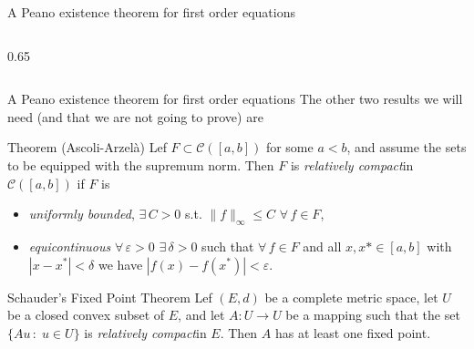\documentclass[aspectratio=169,xcolor=dvipsnames]{beamer}
\begin{document}
\begin{frame}{A Peano existence theorem for first order equations}
{{\begin{columns}
\begin{column}{0.65\columnwidth}
\end{column}
\end{columns}
}
}
\end{frame}

\begin{frame}[fragile]{A Peano existence theorem for first order equations}
The other two results we will need (and that we are not going to prove) are
\begin{alertblock}{Theorem (Ascoli-Arzelà)}
Lef $F \subset \mathcal{C}([a,b])$ for some $a < b$, and assume the sets to be equipped with the supremum norm. Then $F$ is \emph{relatively compact}\footnotemark[1] in $\mathcal{C}([a,b])$ if $F$ is \begin{itemize}
	\item \emph{uniformly bounded}, $\exists\,C > 0$ s.t. $\|f\|_{\infty} \leq C$ $\forall\,f \in F$,
	\item \emph{equicontinuous} $\forall\,\varepsilon > 0$ $\exists\,\delta > 0$ such that $\forall\,f \in F$ and all $x,x* \in [a,b]$ with $|x-x^*| < \delta$ we have $|f(x)-f(x^*)| < \varepsilon$.
\end{itemize}
\end{alertblock}

\begin{alertblock}{Schauder’s Fixed Point Theorem}
Lef $(E,d)$ be a complete metric space, let $U$ be a closed convex subset of $E$, and let $A : U \rightarrow U$ be a mapping such that the set $\{ A u \,:\; u \in U\}$ is \emph{relatively compact}\footnotemark[1]  in $E$. Then $A$ has at least one fixed point.
\end{alertblock}

\end{frame}
\end{document}
